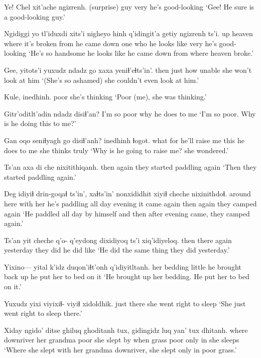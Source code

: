 \documentclass[12pt]{article}
\begin{document}
\gll Ye! Chel xit'ache ngizrenh.
(surprise) guy  very    {he's good-looking}
\glt `Gee! He sure is a good-looking guy.'
\glend

\gll Ngidiggi yo     tl'iduxdi    xits'i nigheyo      hinh  q'idingit'a   getiy ngizrenh ts'i.
up       heaven {where it's broken} from    {he came down} {one who}   {he looks like} very  {he's good-looking}
\glt `He's so handsome he looks like he came down from where heaven broke.'
\glend

\gll Gee, yitots'i yuxudz {ndadz go} xaxa {yeniɬ'eɬts'in'.}
{} then       just   how   unable        {she won't look at him}
\glt `(She's so ashamed) she couldn't even look at him.'
\glend

\gll Kule,      inedhinh.
poor      {she's thinking}
\glt `Poor (me), she was thinking.'
\glend

\gll Gitr'oditlt'adin ndadz disiɬ'an?
{I'm so poor}      why   {he does to me}
\glt `I'm so poor. Why is he doing this to me?'
\glend

\gll Gan  oqo seniɬyagh      go   disiɬ'anh?     inedhinh   ɬogot.
what for {he'll raise me} this {he does to me} {she thinks} truly
\glt `Why is he going to raise me? she wondered.'
\glend

\gll Ts'an {axa di} che   nixitithiqanh.
then    {}  again {they started paddling again}
\glt `Then they started paddling again.'
\glend

\gll Deg idiyiɬ    drin-goqaɬ            ts'in', xaɬts'in' nonxididhit xiyiɬ cheche nixinithdoɬ.
{around here}   {with her} {he's paddling all day} {} evening  {it came again}     then  again   {they camped again}
\glt `He paddled all day by himself and then after evening came, they camped again.'
\glend

\gll Ts'an yit cheche q'o- q'eydong  dixidiyoq ts'i xiq'idiyeloq.
then   there   again {}   yesterday {they did} {} {he did like}
\glt `He did the same thing they did yesterday.'
\glend

\gll Yixino--- yital       k'idz  duqon'iɬt'onh q'idiyitltanh.
{}       {her bedding} little {he brought back up} {he put her to bed on it}
\glt `He brought up her bedding. He put her to bed on it.'
\glend
         
\gll Yuxudz yixi viyixiɬ- {viyiɬ xidoldhik.}
just   there   {}   { she went right to sleep}
\glt `She just went right to sleep there.'
\glend

\gll Xiday ngido'    ditse       ghiluq ghoditanh    tux,  gidingidz luq  yan' tux dhitanh.
where downriver {her grandma} poor   {she slept by} when grass     poor only in {she sleeps}
\glt `Where she slept with her grandma downriver, she slept only in poor grass.'
\glend
\end{document}
